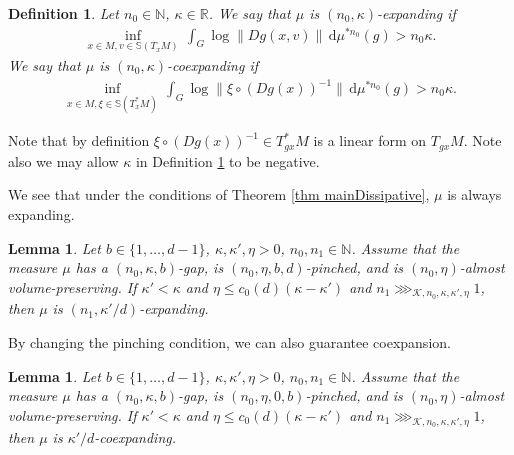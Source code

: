 \documentclass[11pt, leqno, fleqn]{amsart}
\def\eps{\varepsilon}
\newcommand{\margem}[1]{\marginpar{{\scriptsize {#1}}}}
\def\clo{   \color{orange}}
\def\clb{   \color{black}}
\def \R{{\mathbb R}}
\def \N{{\mathbb N}}
\newcommand{\dd}{\,\mathrm{d}}
\newcommand{\cK}{{\mathcal K}}
\newcommand{\aryst}{\begin{eqnarray*}}
\newcommand{\earyst}{\end{eqnarray*}}
\newtheorem{lemma}[thm]{\bf Lemma}
\newtheorem{defi}[thm]{\bf Definition}
\theoremstyle{definition}
\theoremstyle{definition}
\begin{document}
		 \begin{defi} \label{defi coexpanding}  Let $n_{0}\in \N$, $\kappa\in \R$.
We say that  $\mu$ is {\em $(n_{0},\kappa)$-expanding} if 
		 	\aryst
		 	\inf_{x\in M, v\in \mathbb{S}(T_{x}M) }\,  \int_{G} \log \| Dg(x,v)  \| \dd\mu^{* n_{0}}(g) > n_{0}\kappa.
		 	\earyst		
We say that  $\mu$ is {\em $(n_{0},\kappa)$-coexpanding} if 		
		 	\aryst
		 	\inf_{x\in M, \xi \in \mathbb{S}(T^*_{x}M) } \,  \int_{G} \log \|  \xi \circ (Dg(x))^{-1}  \| \dd\mu^{* n_{0}}(g) > n_{0} \kappa.
		 	\earyst
		 \end{defi}
		 Note that by definition $\xi \circ (Dg(x))^{-1} \in T^*_{gx}M$ is a linear form on $T_{gx}M$.
		 Note also we may allow $\kappa$ in Definition \ref{defi coexpanding} to be negative.

\bigskip

		 We  see that under the conditions of Theorem \ref{thm mainDissipative}, $\mu$ is always expanding.
		 
\begin{lemma}\label{lem finetocoexpanding2} 
Let $b\in \{1, \dots, d-1\}$, $\kappa,\kappa', \eta>0$, $n_{0}, n_{1}\in \N$. Assume that the measure  $\mu$ has a $(n_{0},\kappa, b)$-gap, is $(n_{0},\eta, b,d)$-pinched, and is $(n_{0}, \eta)$-almost volume-preserving. 
If $\kappa'<\kappa$ and $\eta\leq c_{0}(d) (\kappa-\kappa')$ and $n_{1}\ggg_{\cK, n_{0}, \kappa, \kappa', \eta} 1$, then $\mu$ is $(n_{1}, \kappa'/d)$-expanding. 

\end{lemma}


By changing the pinching condition, we can also guarantee coexpansion.

\begin{lemma}\label{lem finetocoexpanding} 
Let $b\in \{1, \dots, d-1\}$, $\kappa, \kappa', \eta>0$, $n_{0}, n_{1}\in \N$. Assume that the measure  $\mu$ has a $(n_{0}, \kappa, b)$-gap, is $(n_{0}, \eta, 0,b)$-pinched, and is $(n_{0}, \eta)$-almost volume-preserving.  If $\kappa'<\kappa$ and $\eta\leq c_{0}(d)(\kappa-\kappa')$ and $n_{1}\ggg_{\cK, n_{0}, \kappa, \kappa', \eta} 1$, then $\mu$ is $\kappa'/d$-coexpanding. 
\end{lemma}
\end{document}
